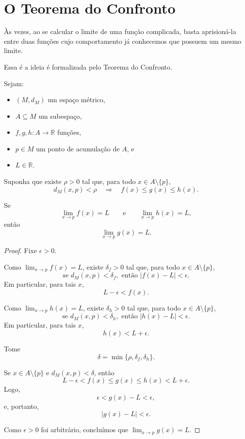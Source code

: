\section{O Teorema do Confronto}

Às vezes, ao se calcular o limite de uma função complicada, basta aprisioná-la entre duas funções cujo comportamento já conhecemos que possuem um mesmo limite.

Essa é a ideia é formalizada pelo Teorema do Confronto.

\begin{proposition}
    Sejam:
    \begin{itemize}
        \item $(M,d_M)$ um espaço métrico,
        \item $A\subseteq M$ um subespaço,
        \item $f,g,h:A\to\mathbb R$ funções,
        \item $p\in M$ um ponto de acumulação de $A$, e
        \item $L\in\mathbb R$.
    \end{itemize}

    Suponha que existe $\rho>0$ tal que, para todo $x\in A\setminus\{p\}$,
    \[
        d_M(x,p)<\rho
        \quad\Longrightarrow\quad
        f(x)\leq g(x)\leq h(x).
    \]

    Se
    \[
        \lim_{x\to p}f(x)=L
        \qquad\text{e}\qquad
        \lim_{x\to p}h(x)=L,
    \]
    então
    \[
        \lim_{x\to p}g(x)=L.
    \]
\end{proposition}

\begin{proof}
    Fixe $\epsilon>0$.

    Como $\lim_{x\to p}f(x)=L$, existe $\delta_f>0$ tal que, para todo $x\in A\setminus\{p\}$,
    \[
        \text{se }d_M(x,p)<\delta_f,\text{ então } |f(x)-L|<\epsilon.
    \]
    Em particular, para tais $x$,
    \[
        L-\epsilon<f(x).
    \]

    Como $\lim_{x\to p}h(x)=L$, existe $\delta_h>0$ tal que, para todo $x\in A\setminus\{p\}$,
    \[
        \text{se }d_M(x,p)<\delta_h,\text{ então } |h(x)-L|<\epsilon.
    \]
    Em particular, para tais $x$,
    \[
        h(x)<L+\epsilon.
    \]

    Tome
    \[
        \delta=\min\{\rho,\delta_f,\delta_h\}.
    \]

    Se $x\in A\setminus\{p\}$ e $d_M(x,p)<\delta$, então
    \[
        L-\epsilon<f(x)\leq g(x)\leq h(x)<L+\epsilon.
    \]
    Logo,
    \[
        \epsilon<g(x)-L<\epsilon,
    \]
    e, portanto,
    \[
        |g(x)-L|<\epsilon.
    \]

    Como $\epsilon>0$ foi arbitrário, concluímos que $\lim_{x\to p}g(x)=L$.
\end{proof}

